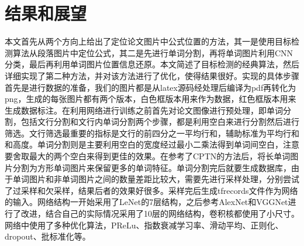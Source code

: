 

\chapter{结果和展望}

本文首先从两个方向上给出了定位论文图片中公式位置的方法，其一是使用目标检测算法从段落图片中定位公式，其二是先进行单词分割，再将单词图片利用CNN分类，最后再利用单词图片位置信息还原。本文简述了目标检测的经典算法，然后详细实现了第二种方法，并对该方法进行了优化，使得结果很好。实现的具体步骤首先是进行数据的准备，我们的图片都是从latex源码经处理后编译为pdf再转化为png，生成的每张图片都有两个版本，白色框版本用来作为数据，红色框版本用来生成数据标注。在利用网络进行训练之前首先对论文图像进行预处理，即单词分割，包括文行分割和文行内单词分割两个步骤，都是利用空白来进行分割然后进行筛选。文行筛选最重要的指标是文行的前四分之一平均行和，辅助标准为平均行和和高度。单词分割则是主要利用空白的宽度经过最小二乘法得到单词间空白，注意要舍取最大的两个空白来得到更佳的效果。在参考了CPTN的方法后，将长单词图片分割为方形单词图片来保留更多的单词特征。单词分割完后就要生成数据库，由于单词图片和非单词图片之间的数量差距比较大，需要先进行采样处理，分别尝试了过采样和欠采样，结果后者的效果好很多。采样完后生成tfrecords文件作为网络的输入。网络结构一开始采用了LeNet的7层结构，之后参考AlexNet和VGGNet进行了改进，结合自己的实际情况采用了10层的网络结构，卷积核都使用了小尺寸。网络中使用了多种优化算法，PReLu、指数衰减学习率、滑动平均、正则化、dropout、批标准化等。




